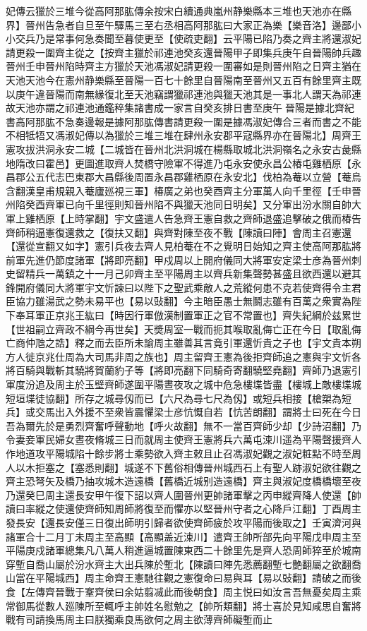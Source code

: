 妃傳云獵於三堆今從高阿那肱傳余按宋白續通典嵐州静樂縣本三堆也天池亦在縣界】晉州告急者自旦至午驛馬三至右丞相高阿那肱曰大家正為樂【樂音洛】邊鄙小小交兵乃是常事何急奏聞至暮使更至【使疏吏翻】云平陽已陷乃奏之齊主將還淑妃請更殺一圍齊主從之【按齊主獵於祁連池癸亥還晉陽甲子即集兵庚午自晉陽帥兵趣晉州壬申晉州陷時齊主方獵於天池馮淑妃請更殺一圍審如是則晉州陷之日齊主猶在天池天池今在憲州静樂縣至晉陽一百七十餘里自晉陽南至晉州又五百有餘里齊主既以庚午違晉陽而南無緣復北至天池竊謂獵祁連池與獵天池其是一事北人謂天為祁連故天池亦謂之祁連池通鑑稡集諸書成一家言自癸亥排日書至庚午晉陽是據北齊紀書高阿那肱不急奏邊報是據阿那肱傳書請更殺一圍是據馮淑妃傳合三者而書之不能不相牴牾又馮淑妃傳以為獵於三堆三堆在肆州永安郡平寇縣界亦在晉陽北】周齊王憲攻拔洪洞永安二城【二城皆在晉州北洪洞城在楊縣取城北洪洞嶺名之永安古彘縣地隋改曰霍邑】更圖進取齊人焚橋守險軍不得進乃屯永安使永昌公椿屯雞栖原【永昌郡公五代志巴東郡大昌縣後周置永昌郡雞栖原在永安北】伐柏為菴以立營【菴烏含翻漢皇甫規親入菴廬廵視三軍】椿廣之弟也癸酉齊主分軍萬人向千里徑【壬申晉州陷癸酉齊軍已向千里徑則知晉州陷不與獵天池同日明矣】又分軍出汾水關自帥大軍上雞栖原【上時掌翻】宇文盛遣人告急齊王憲自救之齊師退盛追擊破之俄而椿告齊師稍逼憲復還救之【復扶又翻】與齊對陳至夜不戰【陳讀曰陣】會周主召憲還【還從宣翻又如字】憲引兵夜去齊人見柏菴在不之覺明日始知之齊主使高阿那肱將前軍先進仍節度諸軍【將即亮翻】甲戍周以上開府儀同大將軍安定梁士彦為晉州刺史留精兵一萬鎮之十一月己卯齊主至平陽周主以齊兵新集聲勢甚盛且欲西還以避其鋒開府儀同大將軍宇文忻諫曰以陛下之聖武乘敵人之荒縱何患不克若使齊得令主君臣協力雖湯武之勢未易平也【易以䜴翻】今主暗臣愚士無鬬志雖有百萬之衆實為陛下奉耳軍正京兆王紘曰【時因行軍倣漢制置軍正之官不常置也】齊失紀綱於兹累世【世祖嗣立齊政不綱今再世矣】天奬周室一戰而扼其喉取亂侮亡正在今日【取亂侮亡商仲虺之誥】釋之而去臣所未諭周主雖善其言竟引軍還忻貴之子也【宇文貴本朔方人徙京兆仕周為大司馬非周之族也】周主留齊王憲為後拒齊師追之憲與宇文忻各將百騎與戰斬其驍將賀蘭豹子等【將即亮翻下同騎奇寄翻驍堅堯翻】齊師乃退憲引軍度汾追及周主於玉壁齊師遂圍平陽晝夜攻之城中危急樓堞皆盡【樓城上敵樓堞城短垣堞徒協翻】所存之城尋仭而已【六尺為尋七尺為仭】或短兵相接【槍槊為短兵】或交馬出入外援不至衆皆震懼梁士彦忼慨自若【忼苦朗翻】謂將士曰死在今日吾為爾先於是勇烈齊奮呼聲動地【呼火故翻】無不一當百齊師少却【少詩沼翻】乃令妻妾軍民婦女晝夜脩城三日而就周主使齊王憲將兵六萬屯涑川遥為平陽聲援齊人作地道攻平陽城陷十餘步將士乘勢欲入齊主敕且止召馮淑妃觀之淑妃粧點不時至周人以木拒塞之【塞悉則翻】城遂不下舊俗相傳晉州城西石上有聖人跡淑妃欲往觀之齊主恐弩矢及橋乃抽攻城木造遠橋【舊橋近城别造遠橋】齊主與淑妃度橋橋壞至夜乃還癸巳周主還長安甲午復下詔以齊人圍晉州更帥諸軍擊之丙申縱齊降人使還【帥讀曰率縱之使還使齊師知周師將復至而懼亦以堅晉州守者之心降戶江翻】丁酉周主發長安【還長安僅三日復出師明引歸者欲使齊師疲於攻平陽而後取之】壬寅濟河與諸軍合十二月丁未周主至高顯【高顯盖近涑川】遣齊王帥所部先向平陽戊申周主至平陽庚戍諸軍總集凡八萬人稍進逼城置陳東西二十餘里先是齊人恐周師猝至於城南穿塹自喬山屬於汾水齊主大出兵陳於塹北【陳讀曰陣先悉薦翻塹七艶翻屬之欲翻喬山當在平陽城西】周主命齊王憲馳往觀之憲復命曰易與耳【易以䜴翻】請破之而後食【左傳齊晉戰于鞌齊侯曰余姑翦㓕此而後朝食】周主悦曰如汝言吾無憂矣周主乘常御馬從數人廵陳所至輒呼主帥姓名慰勉之【帥所類翻】將士喜於見知咸思自奮將戰有司請換馬周主曰朕獨乘良馬欲何之周主欲薄齊師礙塹而止